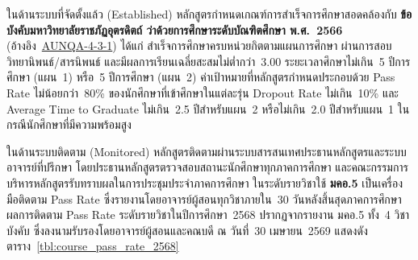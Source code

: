 




ในด้านระบบที่จัดตั้งแล้ว (Established) หลักสูตรกำหนดเกณฑ์การสำเร็จการศึกษาสอดคล้องกับ \textbf{ข้อบังคับมหาวิทยาลัยราชภัฏอุตรดิตถ์ ว่าด้วยการศึกษาระดับบัณฑิตศึกษา พ.ศ.~2566} (อ้างอิง~\hyperlink{ref:AUNQA-4-3-1}{AUNQA-4-3-1}) ได้แก่ สำเร็จการศึกษาครบหน่วยกิตตามแผนการศึกษา ผ่านการสอบวิทยานิพนธ์/สารนิพนธ์ และมีผลการเรียนเฉลี่ยสะสมไม่ต่ำกว่า~3.00 ระยะเวลาศึกษาไม่เกิน~5 ปีการศึกษา (แผน~1) หรือ~5 ปีการศึกษา (แผน~2) ค่าเป้าหมายที่หลักสูตรกำหนดประกอบด้วย Pass Rate ไม่น้อยกว่า~80\% ของนักศึกษาที่เข้าศึกษาในแต่ละรุ่น Dropout Rate ไม่เกิน~10\% และ Average Time to Graduate ไม่เกิน~2.5 ปีสำหรับแผน~2 หรือไม่เกิน~2.0 ปีสำหรับแผน~1 ในกรณีนักศึกษาที่มีความพร้อมสูง

ในด้านระบบติดตาม (Monitored) หลักสูตรติดตามผ่านระบบสารสนเทศประธานหลักสูตรและระบบอาจารย์ที่ปรึกษา โดยประธานหลักสูตรตรวจสอบสถานะนักศึกษาทุกภาคการศึกษา และคณะกรรมการบริหารหลักสูตรรับทราบผลในการประชุมประจำภาคการศึกษา ในระดับรายวิชาใช้ \textbf{มคอ.5} เป็นเครื่องมือติดตาม Pass Rate ซึ่งรายงานโดยอาจารย์ผู้สอนทุกวิชาภายใน~30 วันหลังสิ้นสุดภาคการศึกษา ผลการติดตาม Pass Rate ระดับรายวิชาในปีการศึกษา~2568 ปรากฏจากรายงาน มคอ.5 ทั้ง~4 วิชาบังคับ ซึ่งลงนามรับรองโดยอาจารย์ผู้สอนและคณบดี ณ วันที่~30 เมษายน~2569 แสดงดังตาราง~\ref{tbl:course_pass_rate_2568}

